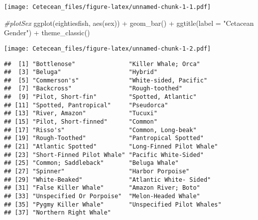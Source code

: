 \documentclass[
]{article}
\newenvironment{Shaded}{\begin{snugshade}}{\end{snugshade}}
\newcommand{\AttributeTok}[1]{\textcolor[rgb]{0.77,0.63,0.00}{#1}}
\newcommand{\CommentTok}[1]{\textcolor[rgb]{0.56,0.35,0.01}{\textit{#1}}}
\newcommand{\DocumentationTok}[1]{\textcolor[rgb]{0.56,0.35,0.01}{\textbf{\textit{#1}}}}
\newcommand{\FunctionTok}[1]{\textcolor[rgb]{0.00,0.00,0.00}{#1}}
\newcommand{\NormalTok}[1]{#1}
\newcommand{\SpecialCharTok}[1]{\textcolor[rgb]{0.00,0.00,0.00}{#1}}
\newcommand{\StringTok}[1]{\textcolor[rgb]{0.31,0.60,0.02}{#1}}
\begin{document}
\texttt{[image: Cetecean\_files/figure-latex/unnamed-chunk-1-1.pdf]}

\begin{Shaded}
\begin{Highlighting}[]
\CommentTok{\#plotSex}
\FunctionTok{ggplot}\NormalTok{(eightiesfish, }\FunctionTok{aes}\NormalTok{(sex)) }\SpecialCharTok{+} \FunctionTok{geom\_bar}\NormalTok{() }\SpecialCharTok{+} \FunctionTok{ggtitle}\NormalTok{(}\AttributeTok{label =} \StringTok{"Cetacean Gender"}\NormalTok{) }\SpecialCharTok{+} \FunctionTok{theme\_classic}\NormalTok{()}
\end{Highlighting}
\end{Shaded}

\texttt{[image: Cetecean\_files/figure-latex/unnamed-chunk-1-2.pdf]}

\begin{Shaded}
\end{Shaded}

\begin{verbatim}
##  [1] "Bottlenose"               "Killer Whale; Orca"      
##  [3] "Beluga"                   "Hybrid"                  
##  [5] "Commerson's"              "White-sided, Pacific"    
##  [7] "Backcross"                "Rough-toothed"           
##  [9] "Pilot, Short-fin"         "Spotted, Atlantic"       
## [11] "Spotted, Pantropical"     "Pseudorca"               
## [13] "River, Amazon"            "Tucuxi"                  
## [15] "Pilot, Short-finned"      "Common"                  
## [17] "Risso's"                  "Common, Long-beak"       
## [19] "Rough-Toothed"            "Pantropical Spotted"     
## [21] "Atlantic Spotted"         "Long-Finned Pilot Whale" 
## [23] "Short-Finned Pilot Whale" "Pacific White-Sided"     
## [25] "Common; Saddleback"       "Beluga Whale"            
## [27] "Spinner"                  "Harbor Porpoise"         
## [29] "White-Beaked"             "Atlantic White- Sided"   
## [31] "False Killer Whale"       "Amazon River; Boto"      
## [33] "Unspecified Or Porpoise"  "Melon-Headed Whale"      
## [35] "Pygmy Killer Whale"       "Unspecified Pilot Whales"
## [37] "Northern Right Whale"
\end{verbatim}

\begin{Shaded}
\end{Shaded}
\end{document}
